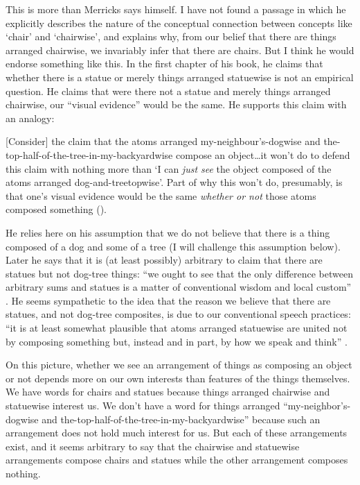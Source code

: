\documentclass[11pt]{article}
\newenvironment{squote}{%
\begin{spacing}{1}
       	\begin{list}{}{%
\setlength{\labelwidth}{0pt}%
\rightmargin\leftmargin%
}
\item\relax
}{%
\end{list}%
\end{spacing}
}
\begin{document}
\begin{spacing}{1.25}
This is more than Merricks says himself.  I have not found a passage
in which he explicitly describes the nature of the conceptual
connection between concepts like `chair' and `chairwise', and explains
why, from our belief that there are things arranged chairwise, we
invariably infer that there are chairs.  But I think he would endorse
something like this.  In the first chapter of his book, he claims that
whether there is a statue or merely things arranged statuewise is not
an empirical question.  He claims that were there not a statue and
merely things arranged chairwise, our ``visual evidence'' would be the
same.  He supports this claim with an analogy:

\begin{squote}
{[}Consider{]} the claim that the atoms arranged my-neighbour's-dogwise
and the-top-half-of-the-tree-in-my-backyardwise compose an
object\ldots{}it won't do to defend this claim with nothing more than `I
can \emph{just see} the object composed of the atoms arranged
dog-and-treetopwise'. Part of why this won't do, presumably, is that
one's visual evidence would be the same \emph{whether or not} those
atoms composed something (\citeyear[8--9]{merricks2001a}).
\end{squote}

He relies here on his assumption that we do not believe that there is
a thing composed of a dog and some of a tree (I will challenge this
assumption below).  Later he says that it is (at least possibly)
arbitrary to claim that there are statues but not dog-tree things:
``we ought to see that the only difference between arbitrary sums and
statues is a matter of conventional wisdom and local custom''
\citeyearpar[75]{merricks2001a}.  He seems sympathetic to the idea
that the reason we believe that there are statues, and not dog-tree
composites, is due to our conventional speech practices: ``it is at
least somewhat plausible that atoms arranged statuewise are united not
by composing something but, instead and in part, by how we speak and
think'' \citeyearpar[121]{merricks2001a}.

On this picture, whether we see an arrangement of things as composing
an object or not depends more on our own interests than features of
the things themselves.  We have words for chairs and statues because
things arranged chairwise and statuewise interest us.  We don't have a
word for things arranged ``my-neighbor's-dogwise and
the-top-half-of-the-tree-in-my-backyardwise'' because such an
arrangement does not hold much interest for us.  But each of these
arrangements exist, and it seems arbitrary to say that the chairwise
and statuewise arrangements compose chairs and statues while the other
arrangement composes nothing.


\end{spacing}
\end{document}

